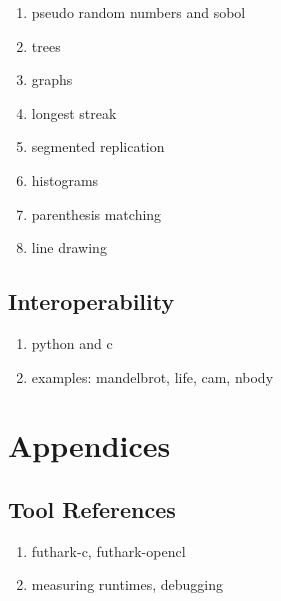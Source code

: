 \documentclass[oneside,11pt]{book}
\newenvironment{wrap}{\vspace{\topskip}\par\noindent\begin{minipage}{\linewidth}}{\end{minipage}\par}
\begin{document}
\begin{wrap}

\end{wrap}



\begin{enumerate}
\item pseudo random numbers and sobol
\item trees
\item graphs
\item longest streak
\item segmented replication
\item histograms
\item parenthesis matching
\item line drawing
\end{enumerate}


\chapter{Interoperability}
\label{chap:interoperability}

\begin{enumerate}
\item python and c
\item examples: mandelbrot, life, cam, nbody
\end{enumerate}




\appendix

\part{Appendices}

\chapter{Tool References}
\begin{enumerate}
\item futhark-c, futhark-opencl
\item measuring runtimes, debugging
\end{enumerate}
\end{document}
